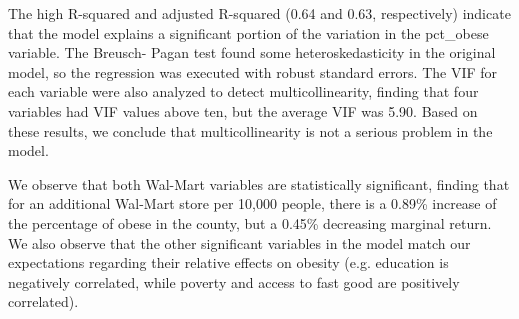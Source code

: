 \fontsize{12bp}{14bp}\selectfont

The high R-squared and adjusted R-squared (0.64 and 0.63, respectively) indicate that the
model explains a significant portion of the variation in the pct_obese variable. The Breusch-
Pagan test found some heteroskedasticity in the original model, so the regression was
executed with robust standard errors. The VIF for each variable were also analyzed to detect
multicollinearity, finding that four variables had VIF values above ten, but the average VIF was
5.90. Based on these results, we conclude that multicollinearity is not a serious problem in the
model. 
\fontsize{12bp}{14bp}\selectfont

We observe that both Wal-Mart variables are statistically significant, finding that for an
additional Wal-Mart store per 10,000 people, there is a 0.89\% increase of the percentage of
obese in the county, but a 0.45\% decreasing marginal return. We also observe that the other
significant variables in the model match our expectations regarding their relative effects on
obesity (e.g. education is negatively correlated, while poverty and access to fast good are
positively correlated).